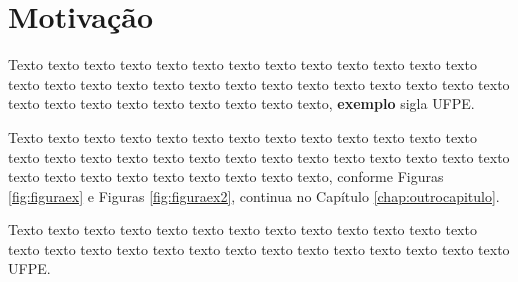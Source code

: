 \section{Motivação}
\label{motivacao}

Texto texto texto texto texto texto texto texto texto texto texto texto texto texto texto texto texto texto texto texto texto texto texto texto texto texto texto texto texto texto texto texto texto texto texto texto, \textbf{exemplo} sigla \gls{UFPE}.



Texto texto texto texto texto texto texto texto texto texto texto texto texto texto texto texto texto texto texto texto texto texto texto texto texto texto texto texto texto texto texto texto texto texto texto texto, conforme Figuras \ref{fig:figuraex} e Figuras \ref{fig:figuraex2}, continua no Capítulo \ref{chap:outrocapitulo}.




Texto texto texto texto texto texto texto texto texto texto texto texto texto texto texto texto texto texto texto texto texto texto texto texto texto texto texto \gls{UFPE}.
